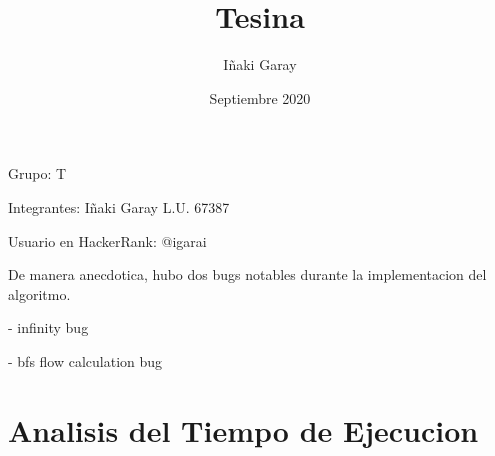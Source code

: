 \documentclass[12pt, a4paper]{article}
\title{Tesina}
\author{Iñaki Garay}
\date{Septiembre 2020}
\begin{document}
Grupo: T

Integrantes: Iñaki Garay L.U. 67387

Usuario en HackerRank: @igarai 

De manera anecdotica, hubo dos bugs notables durante la implementacion del algoritmo.

- infinity bug

- bfs flow calculation bug

\section{Analisis del Tiempo de Ejecucion}
\end{document}
